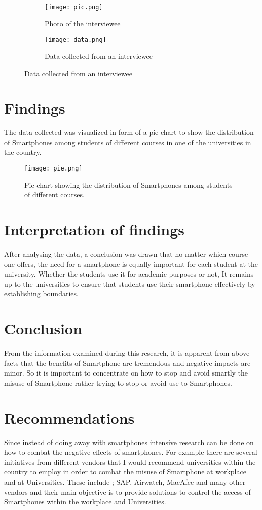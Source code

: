 \documentclass {article}
\begin{document}
\begin{figure}
  \begin{subfigure}[b]{0.5\textwidth}
    \texttt{[image: pic.png]}
    \caption{Photo of the interviewee}
    \label{fig:1}
  \end{subfigure}
  \begin{subfigure}[b]{0.5\textwidth}
    \texttt{[image: data.png]}
    \caption{Data collected from an interviewee}
    \label{fig:2}
  \end{subfigure}
\end{figure}
\FloatBarrier


\section{Findings}
The data collected was visualized in form of a pie chart to show the distribution of Smartphones among students of different courses in one of the universities in the country. 

\begin{figure}[hb]
  \texttt{[image: pie.png]}
  \caption{Pie chart showing the distribution of Smartphones among students of different courses.}
  
\end{figure}
\FloatBarrier


\section{Interpretation of findings}
 After analysing the data, a conclusion was drawn that no matter which course one offers, the need for a smartphone is equally important for each student at the university. Whether the students use it for academic purposes or not, It remains up to the universities to ensure that students use their smartphone effectively by establishing boundaries.
\section{Conclusion}
From the information examined during this research, it is apparent from above facts that  the  benefits  of  Smartphone  are  tremendous  and  negative impacts  are  minor.  So  it  is  important  to  concentrate  on  how  to  stop  and  avoid  smartly  the  misuse  of  Smartphone  rather  trying  to  stop  or  avoid  use to Smartphones. 
\section{Recommendations}

Since instead of doing away with smartphones intensive research can be done on how to combat the negative effects of smartphones. For example there are several initiatives from different  vendors that I would recommend universities within the country to employ in order to combat  the   misuse of  Smartphone at workplace and at  Universities.  These include ; SAP,  Airwatch,  MacAfee  and many other vendors  and their main objective is to provide  solutions  to  control  the  access of     Smartphones within the workplace and Universities.  
\end{document}
